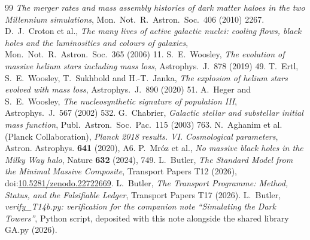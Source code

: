 \documentclass[11pt]{article}
\theoremstyle{definition}
\theoremstyle{plain}
\begin{document}
\begin{thebibliography}{99}
\emph{The merger rates and mass assembly histories of dark matter haloes in the two Millennium simulations},
Mon.\ Not.\ R.\ Astron.\ Soc.\ 406 (2010) 2267.
 D.~J.~Croton et al.,
\emph{The many lives of active galactic nuclei: cooling flows, black holes and the luminosities and colours of galaxies},
Mon.\ Not.\ R.\ Astron.\ Soc.\ 365 (2006) 11.
 S.~E.~Woosley,
\emph{The evolution of massive helium stars including mass loss},
Astrophys.\ J.\ 878 (2019) 49.
 T.~Ertl, S.~E.~Woosley, T.~Sukhbold and H.-T.~Janka,
\emph{The explosion of helium stars evolved with mass loss},
Astrophys.\ J.\ 890 (2020) 51.
 A.~Heger and S.~E.~Woosley,
\emph{The nucleosynthetic signature of population III},
Astrophys.\ J.\ 567 (2002) 532.
 G.~Chabrier,
\emph{Galactic stellar and substellar initial mass function},
Publ.\ Astron.\ Soc.\ Pac.\ 115 (2003) 763.
 N.~Aghanim et al. (Planck Collaboration),
\emph{Planck 2018 results. VI. Cosmological parameters},
Astron. Astrophys. \textbf{641} (2020), A6.
 P.~Mr\'oz et al.,
\emph{No massive black holes in the Milky Way halo},
Nature \textbf{632} (2024), 749.
 L.~Butler,
\emph{The Standard Model from the Minimal Massive Composite},
Transport Papers T12 (2026), doi:\href{https://doi.org/10.5281/zenodo.22722669}{10.5281/zenodo.22722669}.
 L.~Butler,
\emph{The Transport Programme: Method, Status, and the Falsifiable Ledger},
Transport Papers T17 (2026).
 L.~Butler,
\emph{verify\_T14b.py: verification for the companion note ``Simulating the Dark Towers''},
Python script, deposited with this note alongside the shared library GA.py (2026).
\end{thebibliography}
\end{document}

